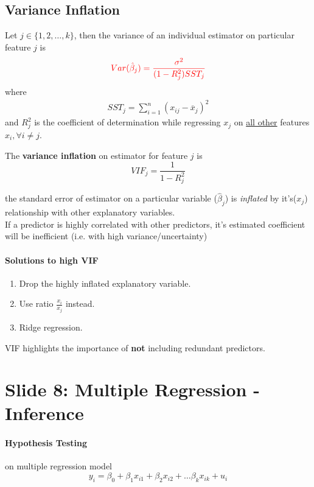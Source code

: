 \documentclass[]{article}
\begin{document}
    	\subsection{Variance Inflation}
    	\par Let $j \in \{1, 2, \dots, k\}$, then the variance of an individual estimator on particular feature $j$ is 
    	\[\textcolor{red}{
    		Var(\hat{\beta}_j) = \frac{\sigma^2}{(1-R_j^2)SST_j}
    	}\]
    	where
    	\begin{gather*}
    		SST_j = \sum_{i=1}^n{(x_{ij} - \overline{x}_j)^2}
    	\end{gather*}
    	and $R_j^2$ is the coefficient of determination while regressing $x_j$ on \ul{all other} features $x_i, \forall i \neq j$.
    	\begin{definition}
    		The \textbf{variance inflation} on estimator for feature $j$ is 
    		\[
    			VIF_j = \frac{1}{1-R_j^2}
    		\]
    	\end{definition}
    	\begin{remark}[Interpretation] the standard error of estimator on a particular variable ($\hat{\beta}_j$) is \emph{inflated} by it's($x_j$) relationship with other explanatory variables. \\
    		If a predictor is highly correlated with other predictors, it's estimated coefficient will be inefficient (i.e. with high variance/uncertainty)
    	\end{remark}	

    	\paragraph{Solutions to high VIF}
    		\begin{enumerate}
    			\item Drop the highly inflated explanatory variable.
    			\item Use ratio $\frac{x_i}{x_j}$ instead.
    			\item Ridge regression.
    		\end{enumerate}
    	\begin{remark}[Interpretation]
    		VIF highlights the importance of \textbf{not} including redundant predictors.
    	\end{remark}
    	
    \section{Slide 8: Multiple Regression - Inference}
    \paragraph{Hypothesis Testing} on multiple regression model 
    	\[
    		y_i = \beta_0 + \beta_1 x_{i1} + \beta_2 x_{i2} + \dots \beta_k x_{ik} + u_i
    	\]
    	
\end{document}
